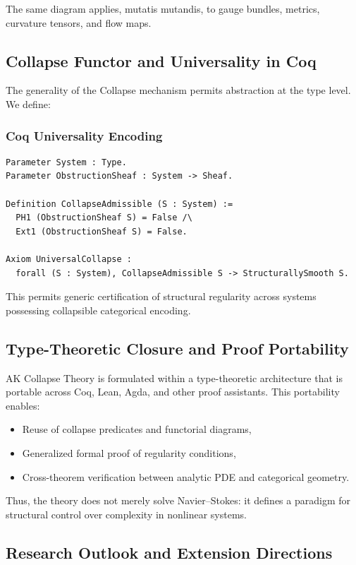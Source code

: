 \documentclass[11pt]{article}
\begin{document}
The same diagram applies, mutatis mutandis, to gauge bundles, metrics, curvature tensors, and flow maps.

\subsection{Collapse Functor and Universality in Coq}

The generality of the Collapse mechanism permits abstraction at the type level. We define:

\subsubsection*{Coq Universality Encoding}
\begin{lstlisting}
Parameter System : Type.
Parameter ObstructionSheaf : System -> Sheaf.

Definition CollapseAdmissible (S : System) :=
  PH1 (ObstructionSheaf S) = False /\
  Ext1 (ObstructionSheaf S) = False.

Axiom UniversalCollapse :
  forall (S : System), CollapseAdmissible S -> StructurallySmooth S.
\end{lstlisting}

This permits generic certification of structural regularity across systems possessing collapsible categorical encoding.

\subsection{Type-Theoretic Closure and Proof Portability}

AK Collapse Theory is formulated within a type-theoretic architecture that is portable across Coq, Lean, Agda, and other proof assistants. This portability enables:

\begin{itemize}
  \item Reuse of collapse predicates and functorial diagrams,
  \item Generalized formal proof of regularity conditions,
  \item Cross-theorem verification between analytic PDE and categorical geometry.
\end{itemize}

Thus, the theory does not merely solve Navier–Stokes: it defines a paradigm for structural control over complexity in nonlinear systems.

\subsection{Research Outlook and Extension Directions}
\end{document}
